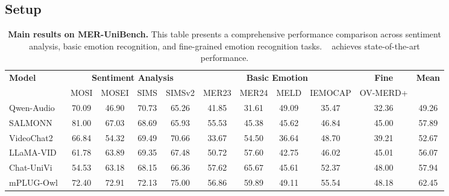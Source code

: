 \documentclass{article}
\theoremstyle{plain}
\theoremstyle{definition}
\theoremstyle{remark}
\begin{document}
\subsection{Setup}
\label{sec:dataset_setting}



\begin{table}[t]
\centering

\fontsize{8.0}{10}\selectfont 
\renewcommand{\arraystretch}{1.25}
\setlength{\tabcolsep}{6.0pt}

\caption{\textbf{Main results on MER-UniBench.} This table presents a comprehensive performance comparison across sentiment analysis, basic
emotion recognition, and fine-grained emotion recognition tasks. \ourmethod~ achieves state-of-the-art performance.}
\label{tab:main}

\begin{tabular}{l @{\hspace{4pt}} cccc @{\hspace{4pt}} cccc @{\hspace{4pt}} c @{\hspace{4pt}} c}
    \toprule
    
    \multirow{2}{*}{\textbf{Model}} 
    & \multicolumn{4}{c}{\textbf{Sentiment Analysis}} 
    & \multicolumn{4}{c}{\textbf{Basic Emotion}} 
    & \textbf{Fine} 
    & \multirow{2}{*}{\textbf{Mean}} \\
    \cmidrule(lr){2-5} \cmidrule(lr){6-9} \cmidrule(lr){10-10}
    & MOSI & MOSEI & SIMS & SIMSv2 
    & MER23 & MER24 & MELD & IEMOCAP 
    & OV-MERD+ & \\
    \midrule

    Qwen-Audio~\cite{chu2023qwen}   & 70.09 & 46.90 & 70.73 & 65.26 & 41.85 & 31.61 & 49.09 & 35.47 & 32.36 & 49.26 \\
    SALMONN~\cite{tang2023salmonn}  & 81.00 & 67.03 & 68.69 & 65.93 & 55.53 & 45.38 & 45.62 & 46.84 & 45.00 & 57.89 \\

    VideoChat2~\cite{li2024mvbench} & 66.84 & 54.32 & 69.49 & 70.66 & 33.67 & 54.50 & 36.64 & 48.70 & 39.21 & 52.67 \\
    LLaMA-VID~\cite{li2024llama}    & 61.78 & 63.89 & 69.35 & 67.48 & 50.72 & 57.60 & 42.75 & 46.02 & 45.01 & 56.07 \\
    Chat-UniVi~\cite{jin2024chat}   & 54.53 & 63.18 & 68.15 & 66.36 & 57.62 & 65.67 & 45.61 & 52.37 & 48.00 & 57.94 \\
    mPLUG-Owl~\cite{ye2023mplug}    & 72.40 & 72.91 & 72.13 & 75.00 & 56.86 & 59.89 & 49.11 & 55.54 & 48.18 & 62.45 \\


\end{tabular}
\end{table}
\end{document}
